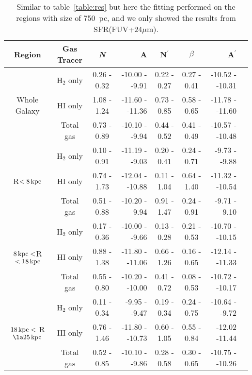 \documentclass[useAMS,usenatbib]{mn2e}
\newcommand \kpc        {\,{\rm kpc}}
\newcommand \nprime {N$^\prime$}
\begin{document}
\begin{table*}
\caption{Similar to table~\ref{table:res} but here the fitting performed on the regions with size of 750~pc, and we only showed the results from SFR(FUV+24$\mu$m).}
\label{table:res750}
\begin{tabular}{cccrccrr}
\hline\hline
\multicolumn{1}{c}{\multirow{1}{*}{Region}}  & Gas Tracer & {\it N} & A  & \nprime & $\beta$ & A$^\prime$ \\
\hline
\multicolumn{1}{c}{\multirow{3}{*}{Whole Galaxy}}
 & H$_2$ only & 0.26 - 0.32 & -10.00 - -9.91   & 0.22 - 0.27  & 0.27 - 0.41    & -10.52 - -10.31  \\
 & HI only    & 1.08 - 1.24 & -11.60 - -11.36  & 0.73 - 0.85  & 0.58 - 0.65    & -11.78 - -11.60     \\
 & Total gas  & 0.73 - 0.89 & -10.10 - -9.94 & 0.44 - 0.52    & 0.41 - 0.49    & -10.57 - -10.48     \\
\hline
\multicolumn{1}{c}{\multirow{3}{*}{R$< 8\kpc$}}
 & H$_2$ only & 0.10 - 0.91 & -11.19 - -9.03  & 0.20 - 0.41   & 0.24 - 0.71   & -9.73 - -9.88      \\
 & HI only    & 0.74 - 1.73 & -12.04 - -10.88 & 0.11 - 1.04    & 0.64 - 1.40    & -11.32 - -10.54     \\
 & Total gas  & 0.51 - 0.88 & -10.20 - -9.94  & 0.91 - 1.47    & 0.24 - 0.91    & -9.71 - -9.10      \\%
\hline
\multicolumn{1}{c}{\multirow{3}{*}{$8\kpc < $R $< 18\kpc$}}
 & H$_2$ only & 0.17 - 0.36 & -10.00 - -9.66  & 0.13 - 0.28    &  0.21 - 0.53   & -10.70 - -10.15       \\
 & HI only    & 0.88 - 1.38 & -11.80 - -11.06 & 0.66 - 1.26    & 0.16 - 0.65    & -12.14 - -11.33     \\
 & Total gas  & 0.55 - 0.80 & -10.20 - -10.00 & 0.41 - 0.72    & 0.08 - 0.53    & -10.72 - -10.17     \\
\hline
\multicolumn{1}{c}{\multirow{3}{*}{$18\kpc <$ R $\la 25\kpc$}} 
 & H$_2$ only & 0.11 - 0.34 & -9.95 - -9.47  & 0.19 - 0.34    & 0.24 - 0.75    & -10.64 - -9.72   \\
 & HI only    & 0.76 - 1.46 & -11.80 - -10.73  & 0.60 - 1.05    & 0.55 - 0.84    & -12.02 -11.44     \\
 & Total gas  & 0.52 - 0.85 & -10.10 - -9.86 & 0.28 - 0.58    & 0.30 - 0.65    & -10.75 - -10.26     \\
 \hline
\end{tabular}
\end{table*}
\end{document}
